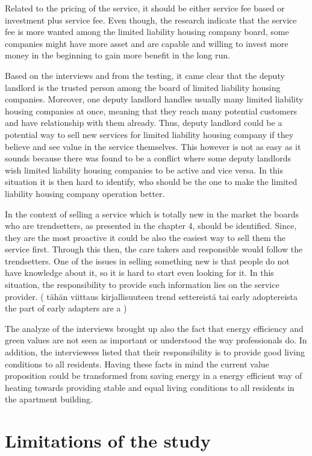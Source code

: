 Related to the pricing of the service, it should be either service fee based or investment plus service fee. Even though, the research indicate that the service fee is more wanted among the limited liability housing company board, some companies might have more asset and are capable and willing to invest more money in the beginning to gain more benefit in the long run.

Based on the interviews and from the testing, it came clear that the deputy landlord is the trusted person among the board of limited liability housing companies. Moreover, one deputy landlord handles usually many limited liability housing companies at once, meaning that they reach many potential customers and have relationship with them already. Thus, deputy landlord could be a potential way to sell new services for limited liability housing company if they believe and see value in the service themselves. This however is not as easy as it sounds because there was found to be a conflict where some deputy landlords wish limited liability housing companies to be active and vice versa. In this situation it is then hard to identify, who should be the one to make the limited liability housing company operation better.

In the context of selling a service which is totally new in the market the boards who are trendsetters, as presented in the chapter 4, should be identified. Since, they are the most proactive it could be also the easiest way to sell them the service first. Through this then, the care takers and responsible would follow the trendsetters. One of the issues in selling something new is that people do not have knowledge about it, so it is hard to start even looking for it. In this situation, the responsibility to provide such information lies on the service provider. ( tähän viittaus kirjallisuuteen trend settereistä tai early adoptereista the part of early adapters are a ) 

The analyze of the interviews brought up also the fact that energy efficiency and green values are not seen as important or understood the way professionals do. In addition, the interviewees listed that their responsibility is to provide good living conditions to all residents. Having these facts in mind the current value proposition could be transformed from saving energy in a energy efficient way of heating towards providing stable and equal living conditions to all residents in the apartment building.

\section{Limitations of the study}

